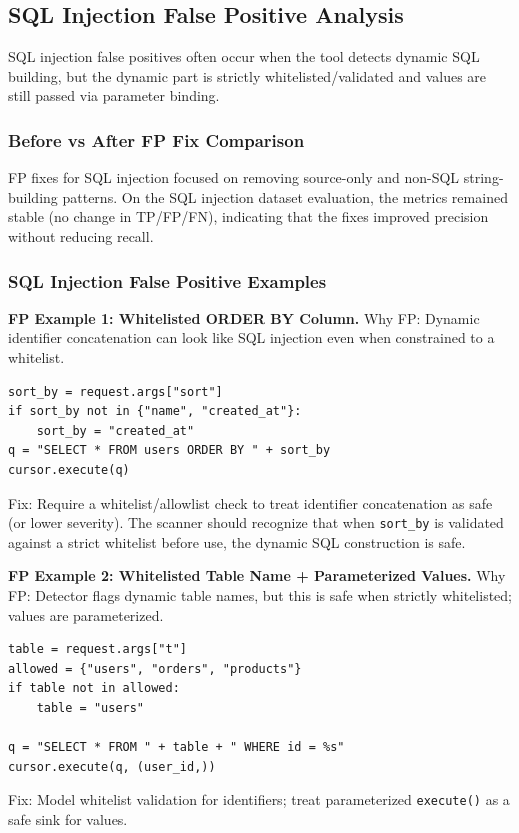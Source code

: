 \subsection{SQL Injection False Positive Analysis}
\label{sec:fp_sqli}

SQL injection false positives often occur when the tool detects dynamic SQL building, but the dynamic part is strictly whitelisted/validated and values are still passed via parameter binding.

\subsubsection{Before vs After FP Fix Comparison}
\label{sec:fp_sqli_comparison}

FP fixes for SQL injection focused on removing source-only and non-SQL string-building patterns. On the SQL injection dataset evaluation, the metrics remained stable (no change in TP/FP/FN), indicating that the fixes improved precision without reducing recall.

\subsubsection{SQL Injection False Positive Examples}
\label{sec:fp_sqli_examples}

\textbf{FP Example 1: Whitelisted ORDER BY Column.} Why FP: Dynamic identifier concatenation can look like SQL injection even when constrained to a whitelist.

\begin{lstlisting}[style=pycode]
sort_by = request.args["sort"]
if sort_by not in {"name", "created_at"}:
    sort_by = "created_at"
q = "SELECT * FROM users ORDER BY " + sort_by
cursor.execute(q)
\end{lstlisting}
Fix: Require a whitelist/allowlist check to treat identifier concatenation as safe (or lower severity). The scanner should recognize that when \texttt{sort\_by} is validated against a strict whitelist before use, the dynamic SQL construction is safe.

\textbf{FP Example 2: Whitelisted Table Name + Parameterized Values.} Why FP: Detector flags dynamic table names, but this is safe when strictly whitelisted; values are parameterized.

\begin{lstlisting}[style=pycode]
table = request.args["t"]
allowed = {"users", "orders", "products"}
if table not in allowed:
    table = "users"

q = "SELECT * FROM " + table + " WHERE id = %s"
cursor.execute(q, (user_id,))
\end{lstlisting}
Fix: Model whitelist validation for identifiers; treat parameterized \texttt{execute()} as a safe sink for values.

